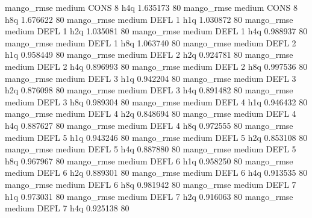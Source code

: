        mango_rmse     medium     CONS                 8                  h4q  1.635173 80
       mango_rmse     medium     CONS                 8                  h8q  1.676622 80
       mango_rmse     medium     DEFL                 1                  h1q  1.030872 80
       mango_rmse     medium     DEFL                 1                  h2q  1.035081 80
       mango_rmse     medium     DEFL                 1                  h4q  0.988937 80
       mango_rmse     medium     DEFL                 1                  h8q  1.063740 80
       mango_rmse     medium     DEFL                 2                  h1q  0.958449 80
       mango_rmse     medium     DEFL                 2                  h2q  0.924781 80
       mango_rmse     medium     DEFL                 2                  h4q  0.896993 80
       mango_rmse     medium     DEFL                 2                  h8q  0.997536 80
       mango_rmse     medium     DEFL                 3                  h1q  0.942204 80
       mango_rmse     medium     DEFL                 3                  h2q  0.876098 80
       mango_rmse     medium     DEFL                 3                  h4q  0.891482 80
       mango_rmse     medium     DEFL                 3                  h8q  0.989304 80
       mango_rmse     medium     DEFL                 4                  h1q  0.946432 80
       mango_rmse     medium     DEFL                 4                  h2q  0.848694 80
       mango_rmse     medium     DEFL                 4                  h4q  0.887627 80
       mango_rmse     medium     DEFL                 4                  h8q  0.972555 80
       mango_rmse     medium     DEFL                 5                  h1q  0.943246 80
       mango_rmse     medium     DEFL                 5                  h2q  0.853108 80
       mango_rmse     medium     DEFL                 5                  h4q  0.887880 80
       mango_rmse     medium     DEFL                 5                  h8q  0.967967 80
       mango_rmse     medium     DEFL                 6                  h1q  0.958250 80
       mango_rmse     medium     DEFL                 6                  h2q  0.889301 80
       mango_rmse     medium     DEFL                 6                  h4q  0.913535 80
       mango_rmse     medium     DEFL                 6                  h8q  0.981942 80
       mango_rmse     medium     DEFL                 7                  h1q  0.973031 80
       mango_rmse     medium     DEFL                 7                  h2q  0.916063 80
       mango_rmse     medium     DEFL                 7                  h4q  0.925138 80
